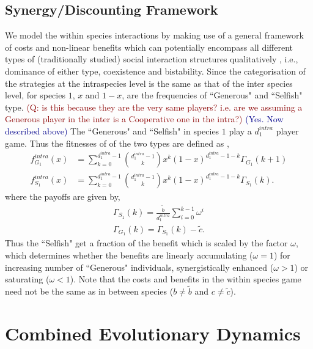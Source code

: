 \documentclass[12pt]{article}
\newcommand{\cha}[1]{\textcolor{darkblue}{(#1)}}
\newcommand{\marcus}[1]{\textcolor{darkred}{(#1)}}
\begin{document}
\begin{appendices}
\subsection*{Synergy/Discounting Framework}
We model the within species interactions by making use of a general framework of costs and non-linear benefits \citep{eshel:AmNat:1988,hauert:JTB:2006a} which can potentially encompass all different types of (traditionally studied) social interaction structures qualitatively \citep{nowak:book:2006}, i.e., dominance of either type, coexistence and bistability.
Since the categorisation of the strategies at the intraspecies level is the same as that of the inter species level, for species $1$, $x$ and $1-x$, are the frequencies of ``Generous" and ``Selfish" type. \marcus{Q: is this because they are the very same players? i.e. are we assuming a Generous player in the inter is a Cooperative one in the intra?}
\cha{Yes. Now described above}
The ``Generous" and ``Selfish" in species $1$ play a $d_1^{intra}$ player game.
Thus the fitnesses of of the two types are defined as \citep{hauert:JTB:2006a},
%
\begin{align}
	f^{intra}_{G_1} (x) &= \sum_{k=0}^{d_1^{intra} -1} \binom{d_1^{intra} -1}{k}x^k (1-x)^{d_1^{intra} -1-k} \Gamma_{G_1}(k+1) \nonumber \\
	f^{intra}_{S_1} (x) &= \sum_{k=0}^{d_1^{intra} -1} \binom{d_1^{intra} -1}{k}x^k (1-x)^{d_1^{intra} -1-k} \Gamma_{S_1}(k).
\label{intrafiteqs}
\end{align}
%
where the payoffs are given by,
\begin{align}
	\Gamma_{S_1} (k) = \frac{\tilde{b}}{d_1^{intra}} \sum_{i=0}^{k-1} \omega^i \nonumber \\
	\Gamma_{G_1} (k) = \Gamma_{S_1} (k) - \tilde{c}.
\label{eqintragamepayoffs}
\end{align}
%
Thus the ``Selfish" get a fraction of the benefit which is scaled by the factor $\omega$, which determines whether the benefits are linearly accumulating ($\omega=1$) for increasing number of ``Generous" individuals, synergistically enhanced ($\omega>1$) or saturating ($\omega<1$).
Note that the costs and benefits in the within species game need not be the same as in between species ($b\neq \tilde{b}$ and $c \neq \tilde{c}$).


\section{Combined Evolutionary Dynamics}
\label{app:combineddyn}


\end{appendices}
\end{document}
